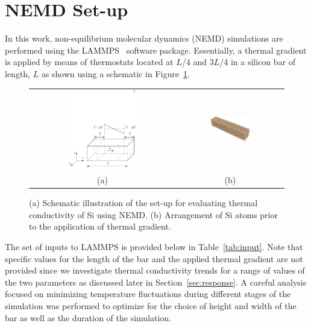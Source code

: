 \section{NEMD Set-up}
\label{sec:setup}

In this work, non-equilibrium molecular dynamics (NEMD) simulations are performed using the 
LAMMPS~\cite{Plimpton:2007} software package.
Essentially, a thermal gradient is applied by means of  thermostats located
at $L$/4 and $3L$/4 in a silicon bar of length, $L$ 
as shown using a schematic in Figure~\ref{fig:setup}. 

\begin{figure}[htbp]
\begin{center}
\begin{tabular}{cc}
  \includegraphics[width=0.48\textwidth]{./Figures/schematic}
  &
  \hspace{3mm}
  \includegraphics[width=0.40\textwidth]{./Figures/Sibar_05}
  \\ (a) & (b)
  \end{tabular}
\caption{(a) Schematic illustration of the set-up for evaluating thermal conductivity of Si using NEMD. (b) 
Arrangement of Si atoms prior to the application of thermal gradient.}
\label{fig:setup}
\end{center}
\end{figure}

The set of
inputs to LAMMPS is provided below in Table~\ref{tab:input}. Note that specific values for the length of the bar
and the applied thermal gradient are not provided since we investigate thermal conductivity trends for a range of 
values of the two parameters as discussed later in Section~\ref{sec:response}. A careful analysis focused on
minimizing temperature fluctuations during different stages of the simulation was performed to optimize for the
choice of height and width of the bar as well as the duration of the simulation. 

